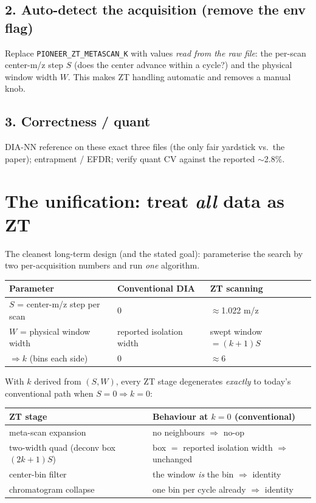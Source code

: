 \documentclass[11pt]{article}
\begin{document}
\subsection{2. Auto-detect the acquisition (remove the env flag)}

Replace \texttt{PIONEER\_ZT\_METASCAN\_K} with values \emph{read from the raw file}:
the per-scan center-m/z step $S$ (does the center advance within a cycle?) and the
physical window width $W$. This makes ZT handling automatic and removes a manual knob.

\subsection{3. Correctness / quant}
DIA-NN reference on these exact three files (the only fair yardstick vs.\ the paper);
entrapment / EFDR; verify quant CV against the reported $\sim$2.8\%.

\section{The unification: treat \emph{all} data as ZT}

The cleanest long-term design (and the stated goal): parameterise the search by two
per-acquisition numbers and run \emph{one} algorithm.

\begin{center}
\begin{tabular}{lll}
\toprule
Parameter & Conventional DIA & ZT scanning \\
\midrule
$S$ = center-m/z step per scan & $0$ & $\approx$1.022 m/z \\
$W$ = physical window width    & reported isolation width & swept window $=(k{+}1)S$ \\
$\Rightarrow k$ (bins each side) & $0$ & $\approx 6$ \\
\bottomrule
\end{tabular}
\end{center}

\noindent With $k$ derived from $(S, W)$, every ZT stage degenerates \emph{exactly}
to today's conventional path when $S = 0 \Rightarrow k = 0$:

\begin{center}
\begin{tabular}{p{} p{}}
\toprule
ZT stage & Behaviour at $k = 0$ (conventional) \\
\midrule
meta-scan expansion & no neighbours $\Rightarrow$ no-op \\
two-width quad (deconv box $(2k{+}1)S$) & box $=$ reported isolation width $\Rightarrow$ unchanged \\
center-bin filter & the window \emph{is} the bin $\Rightarrow$ identity \\
chromatogram collapse & one bin per cycle already $\Rightarrow$ identity \\
\bottomrule
\end{tabular}
\end{center}
\end{document}
